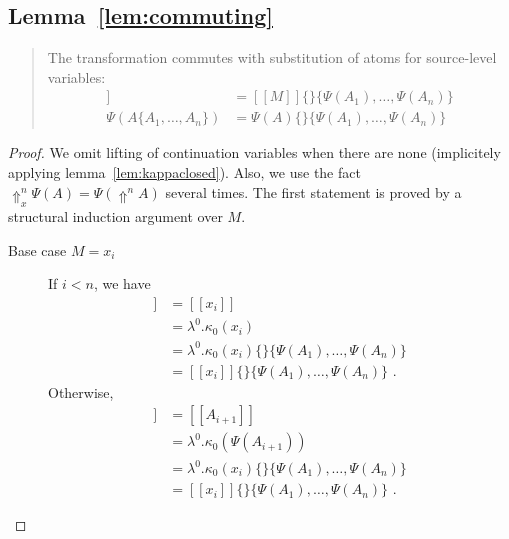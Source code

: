\documentclass[a4paper,11pt,draft]{article}
\begin{document}
\subsection{Lemma~\ref{lem:commuting}}

\begin{quote}
  The transformation commutes with substitution of atoms for source-level variables:
  \begin{align*}
    [\![M\{A_{1}, \ldots, A_{n}\}]\!] &= [\![M]\!]\{\}\{\Psi(A_{1}), \ldots, \Psi(A_{n})\} \\
    \Psi(A\{A_{1}, \ldots, A_{n}\})   &= \Psi(A)\{\}\{\Psi(A_{1}), \ldots, \Psi(A_{n})\}
  \end{align*}
\end{quote}

\begin{proof}
We omit lifting of continuation variables when there are none (implicitely applying
lemma~\ref{lem:kappaclosed}). Also, we use the fact $\Uparrow_{x}^{n} \Psi(A) = \Psi(\Uparrow^{n} A)$
several times. The first statement is proved by a structural induction argument over $M$.

\begin{description}
\item[\sffamily Base case $M = x_{i}$]\hfill

  If $i < n$, we have
  \begin{align*}
    [\![x_{i}\{A_{1}, \ldots, A_{n}\}]\!] &= [\![x_{i}]\!] \\
                                        &= \lambda^{0}.\kappa_{0}(x_{i}) \\
                                        &= \lambda^{0}.\kappa_{0}(x_{i})\{\}\{\Psi(A_{1}), \ldots, \Psi(A_{n})\} \\
                                        &= [\![x_{i}]\!]\{\}\{\Psi(A_{1}), \ldots, \Psi(A_{n})\} \text{ .}
  \end{align*}
  Otherwise,
  \begin{align*}
    [\![x_{i}\{A_{1}, \ldots, A_{n}\}]\!] &= [\![A_{i+1}]\!] \\
                                        &= \lambda^{0}.\kappa_{0}(\Psi(A_{i+1})) \\
                                        &= \lambda^{0}.\kappa_{0}(x_{i})\{\}\{\Psi(A_{1}), \ldots, \Psi(A_{n})\} \\
                                        &= [\![x_{i}]\!]\{\}\{\Psi(A_{1}), \ldots, \Psi(A_{n})\} \text{ .}
  \end{align*}


\end{description}
\end{proof}
\end{document}
